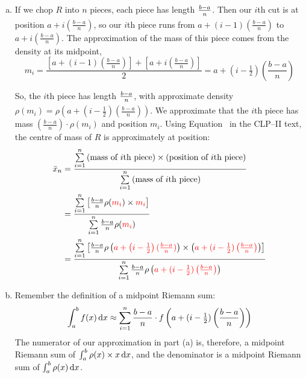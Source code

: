 \begin{solution}
\begin{enumerate}[(a)]
\item
If we chop $R$ into $n$ pieces, each piece has length $\frac{b-a}{\vphantom{\frac12}n}$. Then our $i$th cut is at position $a+i\left(\frac{b-a}{n}\right)$, so our $i$th piece runs from $a+(i-1)\left(\frac{b-a}{n}\right)$ to $a+i\left(\frac{b-a}{n}\right)$. The approximation of the mass of this piece comes from the density at its midpoint, \[m_i=\frac{\left[a+(i-1)\left(\frac{b-a}{n}\right)\right]+\left[a+i\left(\frac{b-a}{n}\right)\right]}{2} = a+(i-\tfrac12)\left(\frac{b-a}{n}\right)\]
\begin{center}
\end{center}
So, the $i$th piece has length $\frac{b-a}{\vphantom{\frac12}n}$, with approximate density $\rho\left(m_i\right)=\rho\left(a+(i-\tfrac12)\left(\frac{b-a}{n}\right)\right)$. We approximate that the $i$th piece has mass
$\left(\frac{b-a}{n}\right)\cdot\rho\left(m_i\right)$
and position
$m_i$. Using Equation~ in the CLP--II text, the centre of mass of $R$ is approximately at position:
\begin{align*}
\bar x_n &= \frac{\sum\limits_{i=1}^n\text{(mass of $i$th piece)}\times\text{(position of $i$th piece)}}{\sum\limits_{i=1}^n\text{(mass of $i$th piece)}}\\
&=\frac{\sum\limits_{i=1}^n\left[\frac{b-a}{n}\rho(\textcolor{red}{m_i})\times\textcolor{red}{m_i}\right]}{\sum\limits_{i=1}^n\frac{b-a}{n}\rho(\textcolor{red}{m_i})}\\
&=\frac{\sum\limits_{i=1}^n\left[\frac{b-a}{n}\rho\left(\textcolor{red}{a+\left(i-\tfrac12\right)(\tfrac{b-a}{n})}\right)\times\left(
\textcolor{red}{
a+(i-\tfrac12)\left(\tfrac{b-a}{n}\right)
}
\right)\right]}{\sum\limits_{i=1}^n\frac{b-a}{n}\rho\left(\textcolor{red}{
a+(i-\tfrac12)\left(\tfrac{b-a}{n}\right)
}
\right)}
\end{align*}

\item
Remember the definition of a midpoint Riemann sum:
\[\int_a^b f(x)\,\mathrm{d}x \approx \sum_{i=1}^n \frac{b-a}{n}\cdot f\left(a+(i-\tfrac12)\left(\frac{b-a}{n}\right)\right)\]
The numerator of our approximation in part (a) is, therefore, a midpoint Riemann sum of $\int_a^b \rho(x)\times x\,\mathrm{d}x$, and the denominator is a midpoint Riemann sum of
$\int_a^b \rho(x)\,\mathrm{d}x$.


\end{enumerate}
\end{solution}

